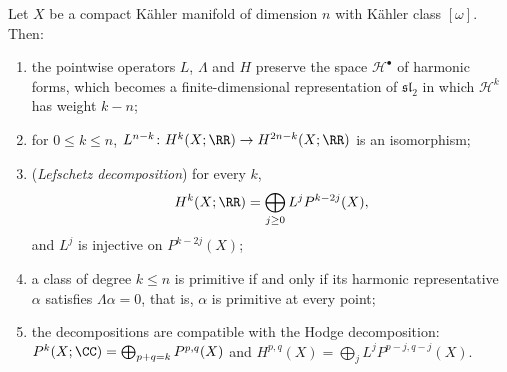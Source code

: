 \begin{theorem}\label{kahler:theorem-hard-lefschetz}
Let $X$ be a compact K\"ahler manifold of dimension $n$ with K\"ahler class $[\omega]$. Then:
\begin{enumerate}
\item the pointwise operators $L$, $\Lambda$ and $H$ preserve the space $\mathcal{H}^\bullet$ of harmonic forms, which becomes a
finite-dimensional representation of $\mathfrak{sl}_2$ in which $\mathcal{H}^k$ has weight $k - n$;
\item for $0 \leq k \leq n$, $L^{n-k} \colon H^k(X; \RR) \to H^{2n-k}(X; \RR)$ is an isomorphism;
\item (\emph{Lefschetz decomposition}) for every $k$,
\[
H^k(X; \RR) = \bigoplus_{j \geq 0}L^jP^{k-2j}(X),
\]
and $L^j$ is injective on $P^{k-2j}(X)$;
\item a class of degree $k \leq n$ is primitive if and only if its harmonic representative $\alpha$ satisfies $\Lambda\alpha = 0$, that is,
$\alpha$ is primitive at every point;
\item the decompositions are compatible with the Hodge decomposition:
$P^k(X; \CC) = \bigoplus_{p+q=k}P^{p,q}(X)$ and $H^{p,q}(X) = \bigoplus_jL^jP^{p-j,q-j}(X)$.
\end{enumerate}
\end{theorem}

